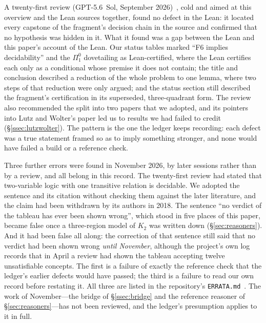 \documentclass[11pt]{article}
\theoremstyle{plain}
\theoremstyle{definition}
\begin{document}
A twenty-first review (GPT-5.6~Sol, September 2026)~\cite{GPT56SolReview},
cold and aimed at this overview and the Lean sources together, found no
defect in the Lean: it located every capstone of the fragment's decision
chain in the source and confirmed that no hypothesis was hidden in it. What
it found was a gap between the Lean and this paper's account of the Lean.
Our status tables marked ``F6 implies decidability'' and the $\Pi^0_1$
dovetailing as Lean-certified, where the Lean certifies each only as a
conditional whose premise it does not contain; the title and conclusion
described a reduction of the whole problem to one lemma, where two steps of
that reduction were only argued; and the status section still described the
fragment's certification in its superseded, three-quadrant form. The review
also recommended the split into two papers that we adopted, and its pointers
into Lutz and Wolter's paper led us to results we had failed to credit
(\S\ref{ssec:lutzwolter}). The pattern is the one the ledger keeps
recording: each defect was a true statement framed so as to imply something
stronger, and none would have failed a build or a reference check.

Three further errors were found in November 2026, by later sessions rather
than by a review, and all belong in this record. The twenty-first review had
stated that two-variable logic with one transitive relation is decidable. We
adopted the sentence and its citation without checking them against the later
literature, and the claim had been withdrawn by its authors in 2018. The
sentence ``no verdict of the tableau has ever been shown wrong'', which stood
in five places of this paper, became false once a three-region model of $K_2$
was written down (\S\ref{sec:reasoners}). And it had been false all along: the
correction of that sentence still said that no verdict had been shown wrong
\emph{until November}, although the project's own log records that in April a
review had shown the tableau accepting twelve unsatisfiable concepts. The
first is a failure of exactly the reference check that the ledger's earlier
defects would have passed; the third is a failure to read our own record
before restating it. All three are listed in the repository's
\texttt{ERRATA.md}~\cite{Errata2026}. The work of November---the bridge of
\S\ref{ssec:bridge} and the reference reasoner of
\S\ref{sec:reasoners}---has not been reviewed, and the ledger's presumption
applies to it in full.
\end{document}
